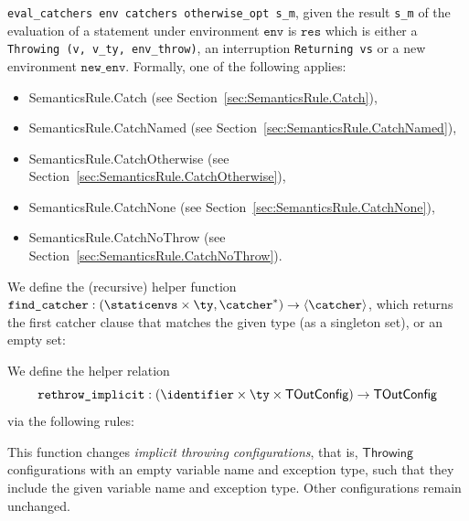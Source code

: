 \documentclass{book}
\newcommand\secref[1]{Section~\ref{sec:#1}}
\newcommand\eqname[0]{\stackrel{\mathsmaller{\mathsf{is}}}{=}}
\newcommand\eqdef[0]{:=}
\newcommand\tenv[0]{\textsf{tenv}}
\newcommand\configdomain[1]{\texttt{config\_domain}({#1})}
\newcommand\evalarrow[0]{\stackrel{\mathsf{asl}}{\rightsquigarrow}}
\newcommand\TOutConfig[0]{\textsf{TOutConfig}}
\newcommand\rethrowimplicit[0]{\texttt{rethrow\_implicit}}
\newcommand\typesatisfies[0]{\texttt{type\_satisfies}}
\newcommand\Throwing[0]{\textsf{Throwing}}
\newcommand\newenv[0]{\texttt{new\_env}}
\newcommand\env[0]{\texttt{env}}
\newcommand\vc[0]{\texttt{c}}
\newcommand\vg[0]{\texttt{g}}
\newcommand\vv[0]{\texttt{v}}
\newcommand\vs[0]{\texttt{s}}
\newcommand\vres[0]{\texttt{res}}
\newcommand\catchers[0]{\texttt{catchers}}
\newcommand\envthrowone[0]{\texttt{env\_throw1}}
\newcommand\ety[0]{\texttt{e\_ty}}
\newcommand\vvty[0]{\texttt{v\_ty}}
\newcommand\nameopt[0]{\texttt{name\_opt}}
\begin{document}
\texttt{eval\_catchers env catchers otherwise\_opt s\_m}, given the result
\texttt{s\_m} of the evaluation of a statement under environment $\env$
is $\vres$ which is either a \texttt{Throwing (v, v\_ty, env\_throw)}, an
interruption \texttt{Returning vs} or a new environment $\newenv$.
Formally, one of the following applies:
\begin{itemize}
\item SemanticsRule.Catch (see \secref{SemanticsRule.Catch}),
\item SemanticsRule.CatchNamed (see \secref{SemanticsRule.CatchNamed}),
\item SemanticsRule.CatchOtherwise (see \secref{SemanticsRule.CatchOtherwise}),
\item SemanticsRule.CatchNone (see \secref{SemanticsRule.CatchNone}),
\item SemanticsRule.CatchNoThrow (see \secref{SemanticsRule.CatchNoThrow}).
\end{itemize}

\newcommand\findcatcher[0]{\texttt{find\_catcher}}
We define the (recursive) helper function $\findcatcher : (\staticenvs \times \ty, \catcher^*) \rightarrow \langle \catcher \rangle$,
which returns the first catcher clause that matches the given type (as a singleton set), or an empty set:

We define the helper relation
\[
  \rethrowimplicit : (\identifier \times \ty \times \TOutConfig) \rightarrow \TOutConfig
\]
via the following rules:
This function changes \emph{implicit throwing configurations}, that is, $\Throwing$ configurations with an empty
variable name and exception type, such that they include the given variable name and exception type.
Other configurations remain unchanged.
\end{document}
